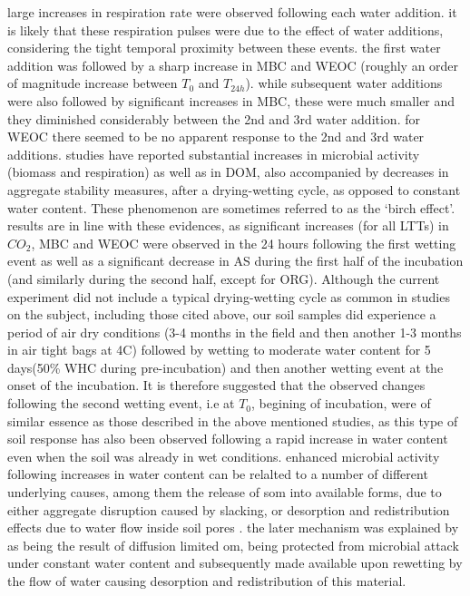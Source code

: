 	large increases in respiration rate were observed following each water addition. it is likely that these respiration pulses were due to the effect of water additions, considering the tight temporal proximity between these events. the first water addition was followed by a sharp increase in MBC and WEOC (roughly an order of magnitude increase between $ T_0 $ and $ T_{24h} $). while subsequent water additions were also followed by significant increases in MBC, these were much smaller and they diminished considerably between the 2nd and 3rd water addition. for WEOC there seemed to be no apparent response to the 2nd and 3rd water additions.
	studies have reported substantial increases in microbial activity (biomass and respiration) as well as in DOM\citep{fierer2003}, also accompanied by decreases in aggregate stability measures\citep{cosentino2006}, after a drying-wetting cycle, as opposed to constant water content. These phenomenon are sometimes referred to as the ‘birch effect’.   results are in line with these evidences, as significant increases (for all LTTs) in  $CO_2 $, MBC and WEOC  were observed in the 24 hours following the first wetting event as well as a significant decrease in AS during the first half of the incubation (and similarly during the second half, except for ORG). Although the current experiment did not include a typical drying-wetting cycle as common in  studies on the subject, including those cited above, our soil samples did experience a period of air dry conditions (3-4 months in the field  and then another 1-3 months in air tight bags at 4C) followed by wetting to moderate water content for 5 days(50\% WHC during pre-incubation) and then another wetting event at the onset of the incubation. It is therefore suggested that the observed changes following the second wetting event, i.e at $ T_0$, begining of incubation, were of similar essence as those described in the above mentioned studies, as this type of soil response has also been observed following a rapid increase in water content even when the soil was already in wet conditions\citep{xiang2008, rey2005}.
	enhanced microbial activity following increases in water content can be relalted to a number of different underlying causes, among them the release of \gls{som} into available forms, due to either aggregate disruption caused by slacking,  or desorption and redistribution effects due to water flow inside soil pores \citep{xiang2008}. the later mechanism was explained by \citeauthor{xiang2008} as being the result of diffusion limited \gls{om}, being protected from microbial attack under constant water content and subsequently made available upon rewetting by the flow of water causing desorption and redistribution of this material. \\
